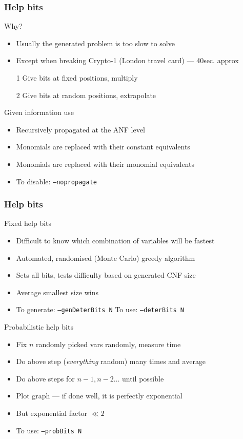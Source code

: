 \documentclass[xcolor=usenames,xcolor=svgnames,table,slidestop,compress,mathserif]{beamer}
\begin{document}
\frame
{\frametitle{Help bits}
\begin{beamerboxesrounded}[shadow=true]{Why?}
\begin{itemize}
 \item Usually the generated problem is too slow to solve
 \item Except when breaking Crypto-1 (London travel card) --- 40sec. approx
 \item[1] Give bits at fixed positions, multiply
 \item[2] Give bits at random positions, extrapolate
\end{itemize}
\end{beamerboxesrounded}

\bigskip

\begin{beamerboxesrounded}[shadow=true]{Given information use}
\begin{itemize}
\item Recursively propagated at the ANF level
\item Monomials are replaced with their constant equivalents
\item Monomials are replaced with their monomial equivalents
\item To disable: \texttt{--nopropagate}
\end{itemize}
\end{beamerboxesrounded}
}

\frame
{\frametitle{Help bits}
\begin{beamerboxesrounded}[shadow=true]{Fixed help bits}
\begin{itemize}
\item Difficult to know which combination of variables will be fastest
\item Automated, randomised (Monte Carlo) greedy algorithm
\item Sets all bits, tests difficulty based on generated CNF size
\item Average smallest size wins
\item To generate: \texttt{--genDeterBits N} To use: \texttt{--deterBits N}
\end{itemize}
\end{beamerboxesrounded}

\smallskip

\begin{beamerboxesrounded}[shadow=true]{Probabilistic help bits}
\begin{itemize}
\item Fix $n$ randomly picked vars randomly, measure time
\item Do above step (\emph{everything} random) many times and average
\item Do above steps for $n-1,n-2\ldots$ until possible
\item Plot graph --- if done well, it is perfectly exponential
\item But exponential factor $\ll 2$
\item To use: \texttt{--probBits N}
\end{itemize}
\end{beamerboxesrounded}
}
\end{document}
